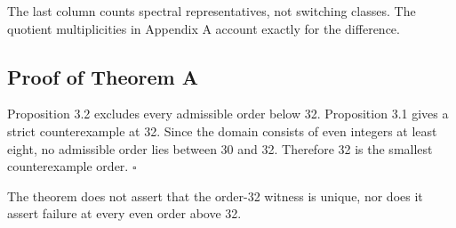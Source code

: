 The last column counts spectral representatives, not switching classes. The
quotient multiplicities in Appendix A account exactly for the difference.

\subsection{Proof of Theorem A}

Proposition 3.2 excludes every admissible order below 32. Proposition 3.1
gives a strict counterexample at 32. Since the domain consists of even integers
at least eight, no admissible order lies between 30 and 32. Therefore 32 is the
smallest counterexample order. \(\square\)

The theorem does not assert that the order-32 witness is unique, nor does it
assert failure at every even order above 32.
